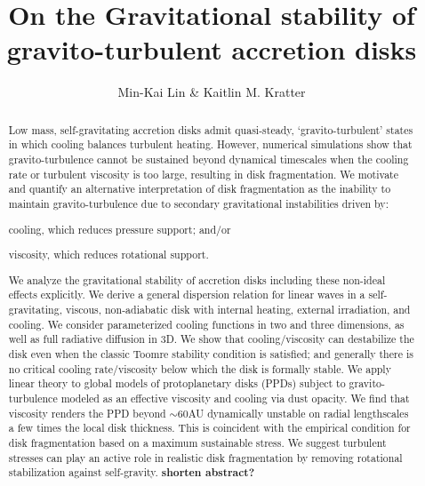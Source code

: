 \documentclass[iop, numberedappendix]{emulateapj}
\begin{document}
\title{On the Gravitational stability of gravito-turbulent accretion disks}
\author{Min-Kai Lin \& Kaitlin M. Kratter}

\begin{abstract}
Low mass, self-gravitating accretion disks admit quasi-steady,
`gravito-turbulent' states in which cooling balances turbulent
heating. However, numerical simulations show that gravito-turbulence
cannot be sustained beyond dynamical timescales when the cooling rate
or turbulent viscosity is too large, resulting in disk fragmentation.        
We motivate and quantify an alternative interpretation of disk
fragmentation as the inability to maintain gravito-turbulence due to  
secondary gravitational instabilities driven by:  
\begin{inparaenum}[1)] 
\item 
  cooling, which reduces pressure support; and/or
\item 
  viscosity, which reduces rotational support. 
\end{inparaenum}
We analyze the gravitational stability of accretion disks 
including these non-ideal effects explicitly.    
We derive a general dispersion relation for linear waves in a 
self-gravitating, viscous, non-adiabatic disk with internal heating,
external irradiation, and cooling. We  
consider parameterized cooling functions in two and three dimensions,
as well as full radiative diffusion in 3D. We show that 
cooling/viscosity can destabilize the disk even when the classic
Toomre stability condition is satisfied; and generally there is
no critical cooling rate/viscosity below which the disk is formally
stable. %
We apply linear theory to 
global models of protoplanetary disks (PPDs) subject to
gravito-turbulence modeled as an effective 
viscosity and cooling via dust opacity. 
We find that viscosity renders the PPD beyond $\sim 60$AU dynamically
unstable on radial %
lengthscales a few times the local disk thickness. This is coincident 
with the empirical condition for disk fragmentation based on a
maximum sustainable stress. 
We suggest turbulent stresses can play an active role in realistic disk 
fragmentation by removing rotational stabilization against 
self-gravity. {\bf shorten abstract?}
\end{abstract}
\end{document}
